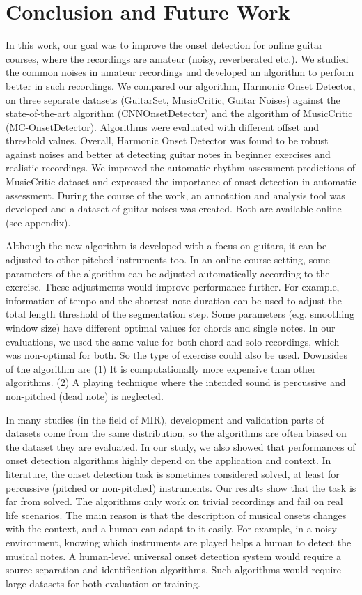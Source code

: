 \chapter{Conclusion and Future Work}
In this work, our goal was to improve the onset detection for online guitar courses, where the recordings are amateur (noisy, reverberated etc.). We studied the common noises in amateur recordings and developed an algorithm to perform better in such recordings. We compared our algorithm, Harmonic Onset Detector, on three separate datasets (GuitarSet, MusicCritic, Guitar Noises) against the state-of-the-art algorithm (CNNOnsetDetector) and the algorithm of MusicCritic (MC-OnsetDetector). Algorithms were evaluated with different offset and threshold values. Overall, Harmonic Onset Detector was found to be robust against noises and better at detecting guitar notes in beginner exercises and realistic recordings. We improved the automatic rhythm assessment predictions of MusicCritic dataset and expressed the importance of onset detection in automatic assessment. During the course of the work, an annotation and analysis tool was developed and a dataset of guitar noises was created. Both are available online (see appendix).

Although the new algorithm is developed with a focus on guitars, it can be adjusted to other pitched instruments too. In an online course setting, some parameters of the algorithm can be adjusted automatically according to the exercise. These adjustments would improve performance further. For example, information of tempo and the shortest note duration can be used to adjust the total length threshold of the segmentation step. Some parameters (e.g. smoothing window size) have different optimal values for chords and single notes. In our evaluations, we used the same value for both chord and solo recordings, which was non-optimal for both. So the type of exercise could also be used. Downsides of the algorithm are (1) It is computationally more expensive than other algorithms. (2) A playing technique where the intended sound is percussive and non-pitched (dead note) is neglected.

In many studies (in the field of MIR), development and validation parts of datasets come from the same distribution, so the algorithms are often biased on the dataset they are evaluated. In our study, we also showed that performances of onset detection algorithms highly depend on the application and context. In literature, the onset detection task is sometimes considered solved, at least for percussive (pitched or non-pitched) instruments. Our results show that the task is far from solved. The algorithms only work on trivial recordings and fail on real life scenarios. The main reason is that the description of musical onsets changes with the context, and a human can adapt to it easily. For example, in a noisy environment, knowing which instruments are played helps a human to detect the musical notes. A human-level universal onset detection system would require a source separation and identification algorithms. Such algorithms would require large datasets for both evaluation or training. 

